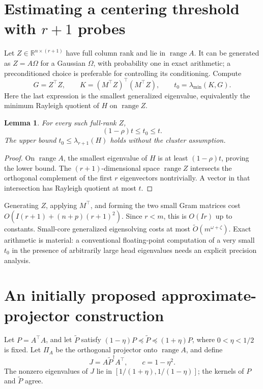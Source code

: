 \documentclass[11pt]{article}
\newtheorem{lemma}[theorem]{Lemma}
\newcommand{\R}{\mathbb R}
\newcommand{\range}{\operatorname{range}}
\newcommand{\tO}{\widetilde O}
\begin{document}
\section{Estimating a centering threshold with \(r+1\) probes}
Let \(Z\in\R^{n\times(r+1)}\) have full column rank and lie in
\(\range A\). It can be generated as \(Z=A\Omega\) for a
Gaussian \(\Omega\), with probability one in exact arithmetic; a
preconditioned choice is preferable for controlling its conditioning.
Compute
\[
 G=Z^\top Z,\qquad K=(M^\top Z)^\top(M^\top Z),\qquad
 t_0=\lambda_{\min}(K,G).
\]
Here the last expression is the smallest generalized eigenvalue, equivalently
the minimum Rayleigh quotient of \(H\) on \(\range Z\).

\begin{lemma}\label{lem:threshold}
For every such full-rank \(Z\),
\[
 (1-\rho)t\le t_0\le t.
\]
The upper bound \(t_0\le\lambda_{r+1}(H)\) holds without the
cluster assumption.
\end{lemma}
\begin{proof}
On \(\range A\), the smallest eigenvalue of \(H\) is at
least \((1-\rho)t\), proving the lower bound. The
\((r+1)\)-dimensional space \(\range Z\) intersects the orthogonal
complement of the first \(r\) eigenvectors nontrivially. A vector in
that intersection has Rayleigh quotient at most \(t\).
\end{proof}

Generating \(Z\), applying \(M^\top\), and forming the two small
Gram matrices cost \(O(I(r+1)+(n+p)(r+1)^2)\). Since \(r<m\),
this is \(O(Ir)\) up to constants. Small-core generalized eigensolving
costs at most \(\tO(m^{\omega+\zeta})\). Exact arithmetic is
material: a conventional floating-point computation of a very small
\(t_0\) in the presence of arbitrarily large head eigenvalues needs
an explicit precision analysis.

\section{An initially proposed approximate-projector construction}
Let \(P=A^\top A\), and let \(\widetilde P\) satisfy
\((1-\eta)P\preceq\widetilde P\preceq(1+\eta)P\), where
\(0<\eta<1/2\) is fixed. Let \(\Pi_A\) be the orthogonal
projector onto \(\range A\), and define
\[
 J=A\widetilde P^\dagger A^\top,\qquad c=1-\eta^2.
\]
The nonzero eigenvalues of \(J\) lie in
\([1/(1+\eta),1/(1-\eta)]\); the kernels of \(P\) and
\(\widetilde P\) agree.
\end{document}
